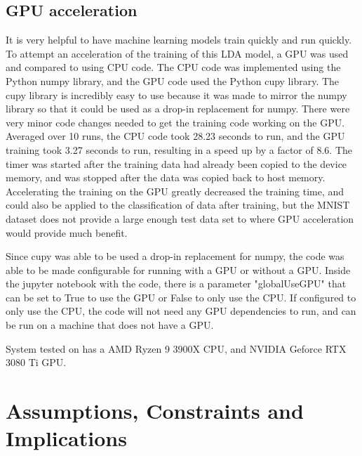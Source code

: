 \documentclass[12pt, twocolumn]{article}
\begin{document}
\subsection{GPU acceleration}
It is very helpful to have machine learning models train quickly and run quickly. To attempt an acceleration of the training of this LDA model, a GPU was used and compared to using CPU code. The CPU code was implemented using the Python numpy library, and the GPU code used the Python cupy library. The cupy library is incredibly easy to use because it was made to mirror the numpy library so that it could be used as a drop-in replacement for numpy. There were very minor code changes needed to get the training code working on the GPU. Averaged over 10 runs, the CPU code took 28.23 seconds to run, and the GPU training took 3.27 seconds to run, resulting in a speed up by a factor of 8.6. The timer was started after the training data had already been copied to the device memory, and was stopped after the data was copied back to host memory. Accelerating the training on the GPU greatly decreased the training time, and could also be applied to the classification of data after training, but the MNIST dataset does not provide a large enough test data set to where GPU acceleration would provide much benefit. 

Since cupy was able to be used a drop-in replacement for numpy, the code was able to be made configurable for running with a GPU or without a GPU. Inside the jupyter notebook with the code, there is a parameter "globalUseGPU" that can be set to True to use the GPU or False to only use the CPU. If configured to only use the CPU, the code will not need any GPU dependencies to run, and can be run on a machine that does not have a GPU.

System tested on has a AMD Ryzen 9 3900X CPU, and NVIDIA Geforce RTX 3080 Ti GPU. 


\section{Assumptions, Constraints and Implications}
\end{document}

